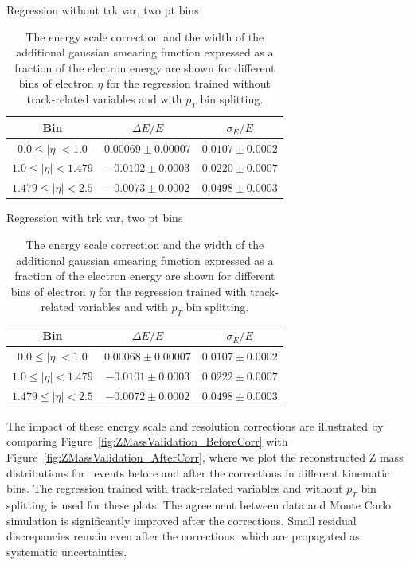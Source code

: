 \documentclass{cmspaper}
\begin{document}
 
\begin{table}[!ht]
\begin{center} 
 Regression without trk var, two pt bins \\
\begin{tabular}{|c|c|c|}
\hline
Bin   &   $\Delta E/E$ &   $\sigma_{E}/E$ \\  \hline
$0.0 \le |\eta| < 1.0$ & $0.00069 \pm 0.00007$ & $0.0107 \pm 0.0002$ \\\hline
$1.0 \le |\eta| < 1.479$ & $-0.0102 \pm 0.0003$ & $0.0220 \pm 0.0007$ \\\hline
$1.479 \le |\eta| < 2.5$ & $-0.0073 \pm 0.0002$ & $0.0498 \pm 0.0003$ \\\hline
\end{tabular}
\caption{The energy scale correction and the width of the additional gaussian smearing function
expressed as a fraction of the electron energy 
are shown for different bins of electron $\eta$ for the regression trained 
without track-related variables and with $p_{T}$ bin splitting.}
\label{tab:EnergyScaleAndResolutionCorrection_Regression3}
\end{center}
\end{table}


\begin{table}[!ht]
\begin{center} 
 Regression with trk var, two pt bins \\
\begin{tabular}{|c|c|c|}
\hline
Bin   &   $\Delta E/E$ &   $\sigma_{E}/E$ \\  \hline
$0.0 \le |\eta| < 1.0$ & $0.00068 \pm 0.00007$ & $0.0107 \pm 0.0002$ \\\hline
$1.0 \le |\eta| < 1.479$ & $-0.0101 \pm 0.0003$ & $0.0222 \pm 0.0007$ \\\hline
$1.479 \le |\eta| < 2.5$ & $-0.0072 \pm 0.0002$ & $0.0498 \pm 0.0003$ \\\hline
\end{tabular}
\caption{The energy scale correction and the width of the additional gaussian smearing function
expressed as a fraction of the electron energy 
are shown for different bins of electron $\eta$ for the regression trained 
with track-related variables and with $p_{T}$ bin splitting.} 
\label{tab:EnergyScaleAndResolutionCorrection_Regression4}
\end{center}
\end{table}


The impact of these energy scale and resolution corrections are illustrated by comparing Figure~\ref{fig:ZMassValidation_BeforeCorr}
with Figure~\ref{fig:ZMassValidation_AfterCorr}, where we plot the reconstructed Z mass distributions for \ZToEE\ events
before and after the corrections in different kinematic bins. The regression trained with track-related variables and 
without $p_{T}$ bin splitting is used for these plots. The agreement between data and Monte Carlo simulation is
significantly improved after the corrections. Small residual discrepancies remain even after the corrections, which are 
propagated as systematic uncertainties. 
 
\end{document}
